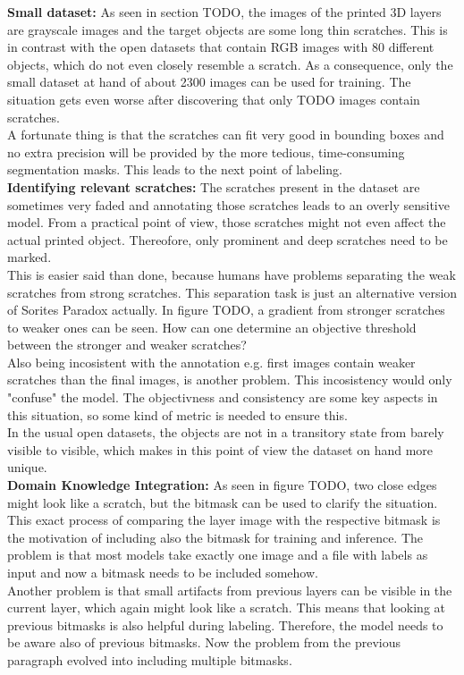 \textbf{Small dataset:}
As seen in section TODO, the images of the printed 3D layers are grayscale images and the target objects are some long thin scratches. This is in contrast with the open datasets that contain RGB images with 80 different objects, which do not even closely resemble a scratch. As a consequence, only the small dataset at hand of about 2300 images can be used for training. The situation gets even worse after discovering that only TODO images contain scratches. \\
A fortunate thing is that the scratches can fit very good in bounding boxes and no extra precision will be provided by the more tedious, time-consuming segmentation masks. This leads to the next point of labeling. \\

\textbf{Identifying relevant scratches:}
The scratches present in the dataset are sometimes very faded and annotating those scratches leads to an overly sensitive model. From a practical point of view, those scratches might not even affect the actual printed object. Thereofore, only prominent and deep scratches need to be marked. \\
This is easier said than done, because humans have problems separating the weak scratches from strong scratches. This separation task is just an alternative version of Sorites Paradox actually. In figure TODO, a gradient from stronger scratches to weaker ones can be seen. How can one determine an objective threshold between the stronger and weaker scratches? \\
Also being incosistent with the annotation e.g. first images contain weaker scratches than the final images, is another problem. This incosistency would only "confuse" the model.
The objectivness and consistency are some key aspects in this situation, so some kind of metric is needed to ensure this.\\
In the usual open datasets, the objects are not in a transitory state from barely visible to visible, which makes in this point of view the dataset on hand more unique. \\

\textbf{Domain Knowledge Integration:}
As seen in figure TODO, two close edges might look like a scratch, but the bitmask can be used to clarify the situation. This exact process of comparing the layer image with the respective bitmask is the motivation of including also the bitmask for training and inference. The problem is that most models take exactly one image and a file with labels as input and now a bitmask needs to be included somehow.\\
Another problem is that small artifacts from previous layers can be visible in the current layer, which again might look like a scratch. This means that looking at previous bitmasks is also helpful during labeling. Therefore, the model needs to be aware also of previous bitmasks. Now the problem from the previous paragraph evolved into including multiple bitmasks. \\


